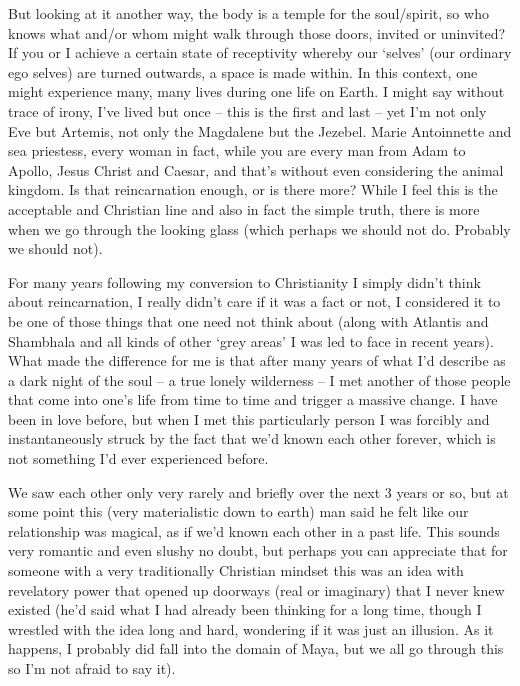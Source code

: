 \begin{footnotesize}
\begin{sffamily}
But looking at it another way, the body is a temple for the soul/spirit, so who knows what and/or whom might walk through those doors, invited or uninvited? If you or I achieve a certain state of receptivity whereby our `selves' (our ordinary ego selves) are turned outwards, a space is made within. In this context, one might experience many, many lives during one life on Earth. I might say without trace of irony, I've lived but once -- this is the first and last -- yet I'm not only Eve but Artemis, not only the Magdalene but the Jezebel. Marie Antoinnette and sea priestess, every woman in fact, while you are every man from Adam to Apollo, Jesus Christ and Caesar, and that's without even considering the animal kingdom. Is that reincarnation enough, or is there more? While I feel this is the acceptable and Christian line and also in fact the simple truth, there is more when we go through the looking glass (which perhaps we should not do. Probably we should not).

For many years following my conversion to Christianity I simply didn't think about reincarnation, I really didn't care if it was a fact or not, I considered it to be one of those things that one need not think about (along with Atlantis and Shambhala and all kinds of other `grey areas' I was led to face in recent years). What made the difference for me is that after many years of what I'd describe as a dark night of the soul -- a true lonely wilderness -- I met another of those people that come into one's life from time to time and trigger a massive change. I have been in love before, but when I met this particularly person I was forcibly and instantaneously struck by the fact that we'd known each other forever, which is not something I'd ever experienced before.

We saw each other only very rarely and briefly over the next 3 years or so, but at some point this (very materialistic down to earth) man said he felt like our relationship was magical, as if we'd known each other in a past life. This sounds very romantic and even slushy no doubt, but perhaps you can appreciate that for someone with a very traditionally Christian mindset this was an idea with revelatory power that opened up doorways (real or imaginary) that I never knew existed (he'd said what I had already been thinking for a long time, though I wrestled with the idea long and hard, wondering if it was just an illusion. As it happens, I probably did fall into the domain of Maya, but we all go through this so I'm not afraid to say it).


\end{sffamily}
\end{footnotesize}
